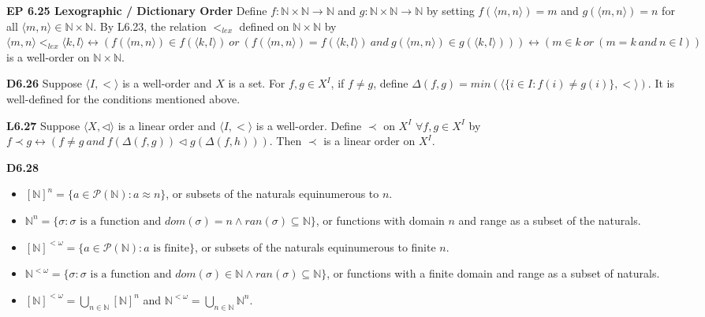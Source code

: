 \documentclass[10pt, landscape]{article}
\begin{document}
\begin{multicols*}{3}
\textbf{EP 6.25 Lexographic / Dictionary Order} Define $f : \mathbb{N} \times \mathbb{N} \rightarrow \mathbb{N}$ and $g : \mathbb{N} \times \mathbb{N} \rightarrow \mathbb{N}$ by setting $f(\langle m, n \rangle)=m$ and $g(\langle m, n \rangle)=n$ for all $\langle m, n \rangle \in \mathbb{N} \times \mathbb{N}$. By L6.23, the relation $<_{lex}$ defined on $\mathbb{N} \times \mathbb{N}$ by $\langle m, n \rangle <_{lex} \langle k, l \rangle \leftrightarrow (f(\langle m, n \rangle)  \in f(\langle k, l \rangle)\ or \ (f(\langle m, n \rangle) = f(\langle k, l \rangle) \ and \ g(\langle m, n \rangle)  \in g(\langle k, l \rangle))) \leftrightarrow (m \in k \ or \ (m = k \ and \ n \in l))$ is a well-order on $\mathbb{N} \times \mathbb{N}$.

\textbf{D6.26} Suppose $\langle I, < \rangle$ is a well-order and $X$ is a set. For $f, g \in X^I$, if $f \neq g$, define $\Delta(f, g) = min(\langle \{i \in I : f(i) \neq g(i)\}, <\rangle)$. It is well-defined for the conditions mentioned above.

\textbf{L6.27} Suppose $\langle X, \lhd \rangle$ is a linear order and $\langle I, < \rangle$ is a well-order. Define $\prec$ on $X^I$ $\forall f, g \in X^I$ by $f \prec g \leftrightarrow (f \neq g \ and \ f(\Delta(f, g)) \lhd g(\Delta(f, h)))$. Then $\prec$ is a linear order on $X^I$.

\textbf{D6.28}
\begin{itemize}
    \item $[\mathbb{N}]^n=\{a \in \mathcal{P}(\mathbb{N}) : a \approx n\}$, or subsets of the naturals equinumerous to $n$.
    \item $\mathbb{N}^n=\{\sigma : \sigma \text{ is a function and } dom(\sigma)=n \land ran(\sigma) \subseteq \mathbb{N}\}$, or functions with domain $n$ and range as a subset of the naturals.
    \item $[\mathbb{N}]^{<\omega}=\{a \in \mathcal{P}(\mathbb{N}): a \text{ is finite}\}$, or subsets of the naturals equinumerous to finite $n$.
    \item $\mathbb{N}^{<\omega} = \{\sigma : \sigma \text{ is a function and } dom(\sigma)\in \mathbb{N} \land ran(\sigma) \subseteq \mathbb{N}\}$, or functions with a finite domain and range as a subset of naturals.
    \item $[\mathbb{N}]^{<\omega}=\bigcup_{n \in \mathbb{N}}[\mathbb{N}]^n$ and $\mathbb{N}^{<\omega}=\bigcup_{n \in \mathbb{N}}\mathbb{N}^n$.
\end{itemize}


\end{multicols*}
\end{document}

